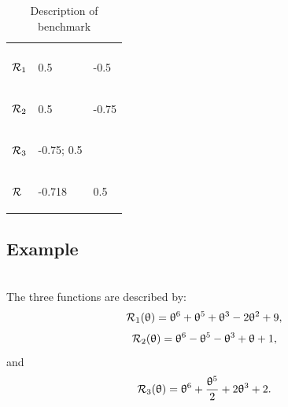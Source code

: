 \documentclass[article,authoryear,jmlmc]{beg_32}             %
\begin{document}
\begin{table}[h!]
	\centering
	\caption{Description of benchmark \exSix}
	\begin{tabular}{lll}
		
		\begin{bf} \diagbox{Functions}{Minimums} \end{bf} & \begin{bf}\mg\end{bf} & \begin{bf}\ml\end{bf} \\
		
		
		\begin{bf}$\mathcal{R}_1$\end{bf} & 0.5 & -0.5  \\ 
		\begin{bf}$\mathcal{R}_2$\end{bf} & 0.5 & -0.75 \\ 
		\begin{bf}$\mathcal{R}_3$\end{bf} & -0.75; 0.5  &  \\ 
		\begin{bf}$\mathcal{R}$\end{bf}   & -0.718 &  0.5 \\ 
	\end{tabular}
	\label{ex6_example}
\end{table}

\subsection{Example \exSeven}
~~\\
The three functions are described by:
\begin{equation*}
	\mathcal{R}_1(\uptheta) = \uptheta^6+\uptheta^5+\uptheta^3-2\uptheta^2+9,
\end{equation*}
\begin{equation*}
	\mathcal{R}_2(\uptheta) = \uptheta^6-\uptheta^5-\uptheta^3+\uptheta+1,
\end{equation*}
and
\begin{equation*}
	\mathcal{R}_3(\uptheta) = \uptheta^6+\frac{\uptheta^5}{2}+2\uptheta^3+2.
\end{equation*}
\end{document}
